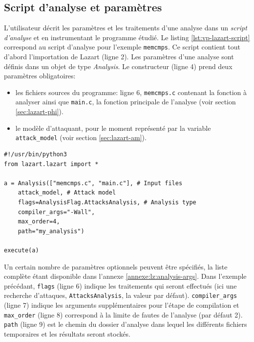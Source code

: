         \subsection{Script d'analyse et paramètres}
        \label{sec:lz:analysis-script}
            
            L'utilisateur décrit les paramètres et les traitements d'une analyse dans un \textit{script d'analyse} et en instrumentant le programme étudié.
            Le listing \ref{lst:vp-lazart-script} correspond au script d'analyse pour l'exemple \texttt{memcmps}.
            Ce script contient tout d'abord l'importation de Lazart (ligne 2). Les paramètres d'une analyse sont définis dans un objet de type \textit{Analysis}. Le constructeur (ligne 4) prend deux paramètres obligatoires: 
            \begin{itemize}
                \item les fichiers sources du programme: ligne 6, \texttt{memcmps.c} contenant la fonction à analyser ainsi que \texttt{main.c}, la fonction principale de l'analyse (voir section \ref{sec:lazart-phi}).
                \item le modèle d'attaquant, pour le moment représenté par la variable \texttt{attack\_model} (voir section \ref{sec:lazart-am}).
            \end{itemize}
            
\begin{lstlisting}    
#!/usr/bin/python3
from lazart.lazart import *

a = Analysis(["memcmps.c", "main.c"], # Input files 
    attack_model, # Attack model
    flags=AnalysisFlag.AttacksAnalysis, # Analysis type
    compiler_args="-Wall",
    max_order=4,
    path="my_analysis")

execute(a)
\end{lstlisting}
            
            Un certain nombre de paramètres optionnels peuvent être spécifiés, la liste complète étant disponible dans l'annexe \ref{annexe:lz:analysis-args}.
            Dans l'exemple précédant, \texttt{flags} (ligne 6) indique les traitements qui seront effectués (ici une recherche d'attaques, \texttt{AttacksAnalysis}, la valeur par défaut).
            \texttt{compiler\_args} (ligne 7) indique les arguments supplémentaires pour l'étape de compilation et \texttt{max\_order} (ligne 8) correspond à la limite de fautes de l'analyse (par défaut 2). \texttt{path} (ligne 9) est le chemin du dossier d'analyse dans lequel les différents fichiers temporaires et les résultats seront stockés.
            
